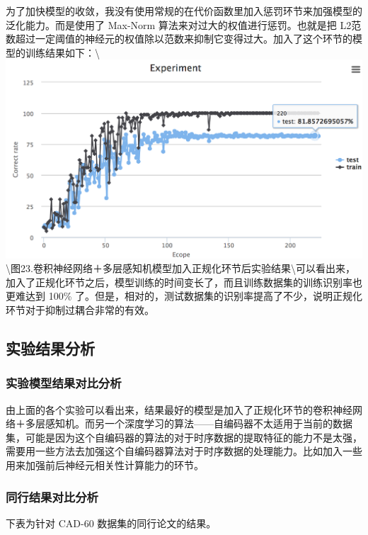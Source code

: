 为了加快模型的收敛，我没有使用常规的在代价函数里加入惩罚环节来加强模型的泛化能力。而是使用了
Max-Norm 算法来对过大的权值进行惩罚。也就是把
L2范数超过一定阈值的神经元的权值除以范数来抑制它变得过大。加入了这个环节的模型的训练结果如下：\textbackslash{}\includegraphics{picture/cnn-mlp-experiment-max-norm.png}\textbackslash{}图23.卷积神经网络＋多层感知机模型加入正规化环节后实验结果\textbackslash{}可以看出来，加入了正规化环节之后，模型训练的时间变长了，而且训练数据集的训练识别率也更难达到
100\%
了。但是，相对的，测试数据集的识别率提高了不少，说明正规化环节对于抑制过耦合非常的有效。

\subsection{实验结果分析}\label{ux5b9eux9a8cux7ed3ux679cux5206ux6790}

\subsubsection{实验模型结果对比分析}\label{ux5b9eux9a8cux6a21ux578bux7ed3ux679cux5bf9ux6bd4ux5206ux6790}

由上面的各个实验可以看出来，结果最好的模型是加入了正规化环节的卷积神经网络＋多层感知机。而另一个深度学习的算法------自编码器不太适用于当前的数据集，可能是因为这个自编码器的算法的对于时序数据的提取特征的能力不是太强，需要用一些方法去加强这个自编码器算法对于时序数据的处理能力。比如加入一些用来加强前后神经元相关性计算能力的环节。

\subsubsection{同行结果对比分析}\label{ux540cux884cux7ed3ux679cux5bf9ux6bd4ux5206ux6790}

下表为针对 CAD-60 数据集的同行论文的结果。

